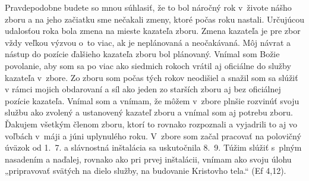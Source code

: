 Pravdepodobne budete so mnou súhlasiť, že to bol náročný rok v~živote nášho zboru a na jeho začiatku sme nečakali zmeny, ktoré počas roku nastali. Určujúcou udalosťou roka bola zmena na mieste kazateľa zboru. Zmena kazateľa je pre zbor vždy veľkou výzvou o~to viac, ak je neplánovaná a neočakávaná. Môj návrat a nástup do pozície ďalšieho kazateľa zboru bol plánovaný. Vnímal som Božie povolanie, aby som sa po viac ako siedmich rokoch vrátil aj oficiálne do služby kazateľa v~zbore. Zo zboru som počas tých rokov neodišiel a snažil som sa slúžiť v rámci mojich obdarovaní a síl ako jeden zo starších zboru aj bez oficiálnej pozície kazateľa. Vnímal som a vnímam, že môžem v~zbore plnšie rozvinúť svoju službu ako zvolený a ustanovený kazateľ zboru a vnímal som aj potrebu zboru. Ďakujem všetkým členom zboru, ktorí to rovnako rozpoznali a vyjadrili to aj vo voľbách v~máji a júni uplynulého roku. V~zbore som začal pracovať na polovičný úväzok od 1.~7. a slávnostná inštalácia sa uskutočnila 8.~9. Túžim slúžiť s~plným nasadením a naďalej, rovnako ako pri prvej inštalácii, vnímam ako svoju úlohu „pripravovať svätých na dielo služby, na budovanie Kristovho tela.“ (Ef 4,12).

